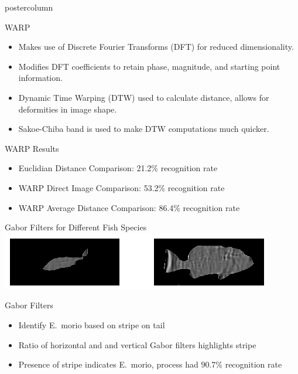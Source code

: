 \documentclass[final]{beamer}
\begin{document}
\begin{frame}
\begin{columns}
\begin{column}{.33\textwidth}
\begin{beamercolorbox}[center,wd=\textwidth]{postercolumn}
\begin{minipage}[T]{.95\textwidth}
{            \begin{block}{WARP}
	      \begin{itemize}
              \item Makes use of Discrete Fourier Transforms (DFT) for reduced dimensionality.
	      \item Modifies DFT coefficients to retain phase, magnitude, and starting point information.
	      \item Dynamic Time Warping (DTW) used to calculate distance, allows for deformities in image shape.
	      \item Sakoe-Chiba band is used to make DTW computations much quicker.
	      \end{itemize}
            \end{block}
            \vfill
            \begin{block}{WARP Results}
              \begin{itemize}
	      \item Euclidian Distance Comparison: 21.2\% recognition rate
              \item WARP Direct Image Comparison: 53.2\% recognition rate
              \item WARP Average Distance Comparison: 86.4\% recognition rate
              \end{itemize}              
            \end{block}
            \vfill
            \begin{block}{Gabor Filters for Different Fish Species}
              \centering
              \includegraphics[width=.95\linewidth]{figures/Gabor}
            \end{block}
            \vfill
            \begin{block}{Gabor Filters}
              \begin{itemize}
              \item Identify E.~morio based on stripe on tail
              \item Ratio of horizontal and and vertical Gabor filters highlights stripe
              \item Presence of stripe indicates E.~morio, process had 90.7\% recognition rate
              \end{itemize}              

\end{block}}
\end{minipage}
\end{beamercolorbox}
\end{column}
\end{columns}
\end{frame}
\end{document}
